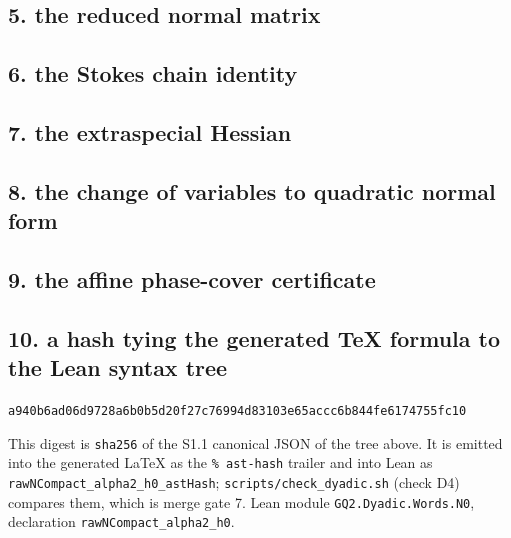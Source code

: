 \subsection{5. the reduced normal matrix}

\subsection{6. the Stokes chain identity}

\subsection{7. the extraspecial Hessian}

\subsection{8. the change of variables to quadratic normal form}

\subsection{9. the affine phase-cover certificate}

\subsection{10. a hash tying the generated TeX formula to the Lean syntax tree}
\begin{center}\texttt{a940b6ad06d9728a6b0b5d20f27c76994d83103e65accc6b844fe6174755fc10}\end{center}
This digest is \texttt{sha256} of the S1.1 canonical JSON of the tree above.  It is emitted into the generated \LaTeX{} as the \texttt{\% ast-hash} trailer and into Lean as \texttt{rawNCompact\_alpha2\_h0\_astHash}; \texttt{scripts/check\_dyadic.sh} (check D4) compares them, which is merge gate 7.
Lean module \texttt{GQ2.Dyadic.Words.N0}, declaration \texttt{rawNCompact\_alpha2\_h0}.

